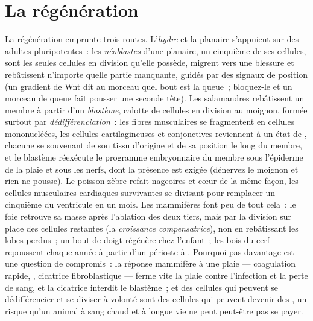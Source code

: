 \section{La régénération}

\begin{definition}\label{def:b3:stem-cells:regeneration}
La régénération emprunte trois routes. L'\emph{hydre} et la planaire
s'appuient sur des  adultes pluripotentes~: les
\emph{néoblastes} d'une planaire, un cinquième de ses cellules, sont les
seules cellules en division qu'elle possède, migrent vers une blessure
et rebâtissent n'importe quelle partie manquante, guidés par des signaux
de position (un gradient de Wnt dit au morceau quel bout est la queue~;
bloquez-le et un morceau de queue fait pousser une seconde tête). Les
salamandres rebâtissent un membre à partir d'un \emph{blastème},
calotte de cellules en division au moignon, formée surtout par
\emph{dédifférenciation}~: les fibres musculaires se fragmentent en
cellules mononucléées, les cellules cartilagineuses et conjonctives
reviennent à un état de , chacune se souvenant de son tissu
d'origine et de sa position le long du membre, et le blastème
réexécute le programme embryonnaire du membre sous l'épiderme de la
plaie et sous les nerfs, dont la présence est exigée (dénervez le
moignon et rien ne pousse). Le poisson-zèbre refait nageoires et cœur de
la même façon, les cellules musculaires cardiaques survivantes se
divisant pour remplacer un cinquième du ventricule en un mois. Les
mammifères font peu de tout cela~: le foie retrouve sa masse après
l'ablation des deux tiers, mais par la division sur place des cellules
restantes (la \emph{croissance compensatrice}), non en rebâtissant les
lobes perdus~; un bout de doigt régénère chez l'enfant~; les bois du
cerf repoussent chaque année à partir d'un périoste à .
Pourquoi pas davantage est une question de compromis~: la réponse
mammifère à une plaie --- coagulation rapide, , cicatrice
fibroblastique --- ferme vite la plaie contre l'infection et la perte de
sang, et la cicatrice interdit le blastème~; et des cellules qui peuvent
se dédifférencier et se diviser à volonté sont des cellules qui peuvent
devenir des , un risque qu'un animal à sang chaud et à longue vie
ne peut peut-être pas se payer.
\end{definition}


